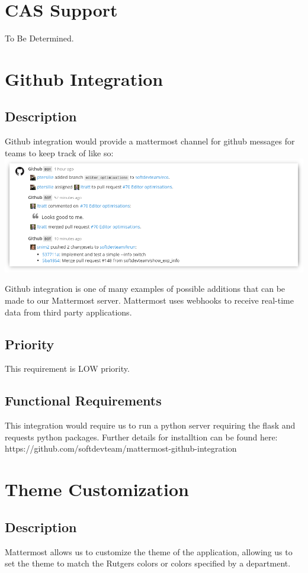 \documentclass{scrreprt}
\begin{document}
\section{CAS Support}
To Be Determined.

\section{Github Integration}
\subsection{Description}
Github integration would provide a mattermost channel for github messages for
teams to keep track of like so:\\
\includegraphics[scale=0.5, width=\textwidth]{github-integration.png}

Github integration is one of many examples of possible additions that can be
made to our Mattermost server.  Mattermost uses webhooks to receive real-time
data from third party applications.
\subsection{Priority}
This requirement is LOW priority.
\subsection{Functional Requirements}
This integration would require us to run a python server requiring the flask
and requests python packages.  Further details for installtion can be found
here: https://github.com/softdevteam/mattermost-github-integration

\section{Theme Customization}
\subsection{Description}
Mattermost allows us to customize the theme of the application, allowing us to
set the theme to match the Rutgers colors or colors specified by a department.
\end{document}
